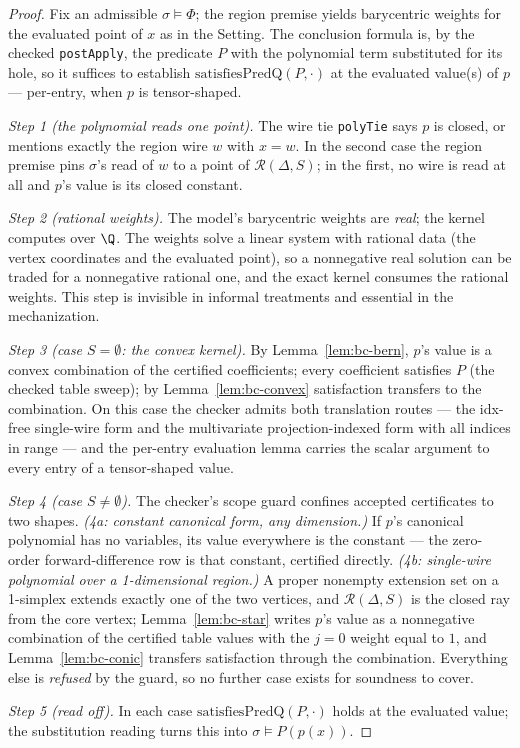 \begin{proof}
Fix an admissible $\sigma \models \Phi$; the region premise yields
barycentric weights for the evaluated point of $x$ as in the Setting.
The conclusion formula is, by the checked \texttt{postApply}, the
predicate $P$ with the polynomial term substituted for its hole, so it
suffices to establish $\mathrm{satisfiesPredQ}(P, \cdot)$ at the
evaluated value(s) of $p$ --- per-entry, when $p$ is tensor-shaped.

\emph{Step 1 (the polynomial reads one point).} The wire tie
\texttt{polyTie} says $p$ is closed, or mentions exactly the region
wire $w$ with $x = w$. In the second case the region premise pins
$\sigma$'s read of $w$ to a point of $\mathcal{R}(\Delta, S)$; in the
first, no wire is read at all and $p$'s value is its closed constant.

\emph{Step 2 (rational weights).} The model's barycentric weights are
\emph{real}; the kernel computes over $\Q$. The weights solve a linear
system with rational data (the vertex coordinates and the evaluated
point), so a nonnegative real solution can be traded for a nonnegative
rational one, and the exact kernel consumes the rational weights. This
step is invisible in informal treatments and essential in the
mechanization.

\emph{Step 3 (case $S = \emptyset$: the convex kernel).} By
Lemma~\ref{lem:bc-bern}, $p$'s value is a convex combination of the
certified coefficients; every coefficient satisfies $P$ (the checked
table sweep); by Lemma~\ref{lem:bc-convex} satisfaction transfers to
the combination. On this case the checker admits both translation
routes --- the idx-free single-wire form and the multivariate
projection-indexed form with all indices in range --- and the per-entry
evaluation lemma carries the scalar argument to every entry of a
tensor-shaped value.

\emph{Step 4 (case $S \neq \emptyset$).} The checker's scope guard
confines accepted certificates to two shapes. \emph{(4a: constant
canonical form, any dimension.)} If $p$'s canonical polynomial has no
variables, its value everywhere is the constant --- the zero-order
forward-difference row is that constant, certified directly.
\emph{(4b: single-wire polynomial over a 1-dimensional region.)} A
proper nonempty extension set on a 1-simplex extends exactly one of the
two vertices, and $\mathcal{R}(\Delta, S)$ is the closed ray from the
core vertex; Lemma~\ref{lem:bc-star} writes $p$'s value as a
nonnegative combination of the certified table values with the $j = 0$
weight equal to $1$, and Lemma~\ref{lem:bc-conic} transfers
satisfaction through the combination. Everything else is
\emph{refused} by the guard, so no further case exists for soundness
to cover.

\emph{Step 5 (read off).} In each case
$\mathrm{satisfiesPredQ}(P, \cdot)$ holds at the evaluated value; the
substitution reading turns this into
$\sigma \models P(p(x))$.
\end{proof}

